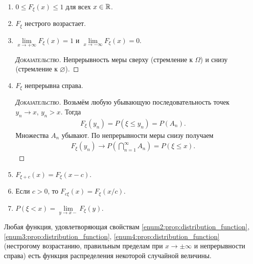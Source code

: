 \documentclass[../main.tex]{subfiles}
\begin{document}
\begin{prop}\
 \begin{enumerate}
  \item $0 \leqslant F_{\xi}(x) \leqslant 1$ для всех $ x \in \mathbb{R} $.
  \item \label{enum2:prop:distribution_function} $F_{\xi}$  нестрого возрастает.
  \item \label{enum3:prop:distribution_function} $\lim\limits_{x \to +\infty} F_{\xi}(x) = 1$  и $\lim\limits_{x \to -\infty} F_{\xi}(x) = 0$.
   \begin{proof}[\normalfont\textsc{Доказательство}]
    Непрерывность меры сверху (стремление к $\Omega$) и снизу (стремление к $\varnothing$).
   \end{proof}
  \item \label{enum4:prop:distribution_function} $F_{\xi}$  непрерывна справа.
   \begin{proof}[\normalfont\textsc{Доказательство}]
    Возьмём любую убывающую последовательность точек $y_n \to x$, $y_n > x$. Тогда
    \begin{align*}
     F_{\xi}(y_n) = P(\xi \leqslant y_n) = P(A_n)
    .\end{align*} Множества $A_n$ убывают. По непрерывности меры снизу получаем
    \begin{align*}
     F_{\xi}(y_n) \to P \left( \bigcap_{n=1}^{\infty} A_n \right) = P(\xi \leqslant x).
    \end{align*} 
   \end{proof}
  \item $F_{\xi + c}(x) = F_{\xi}(x - c)$.
  \item Если $c > 0$, то $F_{c\xi}(x) = F_{\xi}(x / c)$.
  \item $P(\xi < x) = \lim\limits_{y \to x-} F_{\xi}(y)$.
 \end{enumerate}
\end{prop}
\begin{remrk}
 Любая функция, удовлетворяющая свойствам \ref{enum2:prop:distribution_function}, \ref{enum3:prop:distribution_function}, \ref{enum4:prop:distribution_function} (нестрогому возрастанию, правильным пределам при $ x \to \pm \infty $ и непрерывности справа) есть функция распределения некоторой случайной величины.
\end{remrk}
\end{document}
